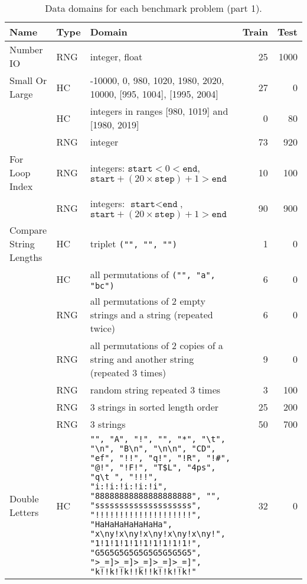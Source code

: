\documentclass{sig-alternate}
\begin{document}

\begin{table*}
\centering
\caption{Data domains for each benchmark problem (part 1).}
\label{datadomains1}
\begin{tabular}{>{\raggedright}p{3.5cm} l >{\raggedright}p{9.8cm} rr}
\toprule
\textbf{Name} & \textbf{Type} & \textbf{Domain} & \textbf{Train} & \textbf{Test} \\
\midrule
Number IO & RNG & integer, float & 25 & 1000 \tabularnewline
Small Or Large & HC & -10000, 0, 980, 1020, 1980, 2020, 10000, [995, 1004], [1995, 2004] & 27 & 0 \tabularnewline
 & HC & integers in ranges [980, 1019] and [1980, 2019] & 0 & 80 \tabularnewline
 & RNG & integer & 73 & 920 \tabularnewline
For Loop Index & RNG & integers: $\texttt{start} < 0 < \texttt{end}$, $ \texttt{start} + (20 \times \texttt{step}) + 1 > \texttt{end}$ & 10 & 100 \tabularnewline
 & RNG & integers: $\texttt{start} < \texttt{end}$, $ \texttt{start} + (20 \times \texttt{step}) + 1 > \texttt{end}$ & 90 & 900 \tabularnewline
Compare String Lengths & HC & triplet \texttt{("", "", "")} & 1 & 0 \tabularnewline
 & HC & all permutations of \texttt{("", "a", "bc")} & 6 & 0 \tabularnewline
 & RNG & all permutations of 2 empty strings and a string (repeated twice) & 6 & 0 \tabularnewline
 & RNG & all permutations of 2 copies of a string and another string (repeated 3 times) & 9 & 0 \tabularnewline
 & RNG & random string repeated 3 times & 3 & 100 \tabularnewline
 & RNG & 3 strings in sorted length order & 25 & 200 \tabularnewline
 & RNG & 3 strings & 50 & 700 \tabularnewline
Double Letters & HC & \texttt{"", "A", "!", "\textvisiblespace", "*", "\textbackslash t", "\textbackslash n", "B\textbackslash n", "\textbackslash n\textbackslash n", "CD", "ef", "!!", "q!", "!R", "!\#", "@!", "!F!", "T\$L", "4ps", "q\textbackslash t ", "!!!", "i:!i:!i:!i:!i", "88888888888888888888", "\textvisiblespace\textvisiblespace\textvisiblespace\textvisiblespace \textvisiblespace\textvisiblespace\textvisiblespace\textvisiblespace \textvisiblespace\textvisiblespace\textvisiblespace\textvisiblespace \textvisiblespace\textvisiblespace\textvisiblespace\textvisiblespace \textvisiblespace\textvisiblespace\textvisiblespace\textvisiblespace", "ssssssssssssssssssss", "!!!!!!!!!!!!!!!!!!!!", "Ha\textvisiblespace Ha\textvisiblespace Ha\textvisiblespace Ha\textvisiblespace Ha\textvisiblespace Ha\textvisiblespace Ha", "x\textbackslash ny!x\textbackslash ny!x\textbackslash ny!x\textbackslash ny!x\textbackslash ny!", "1!1!1!1!1!1!1!1!1!1!", "G5G5G5G5G5G5G5G5G5G5", ">_=]>_=]>_=]>_=]>_=]", "k!!k!!k!!k!!k!!k!!k!"} & 32 & 0 \tabularnewline

\end{tabular}
\end{table*}
\end{document}
